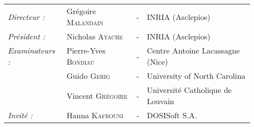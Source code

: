 \begin{titlepage}
\begin{center}
\begin{tabular}{llcl}
      \textit{Directeur :}	& Grégoire \textsc{Malandain}		& - & INRIA (Asclepios)\\
      \textit{Président :}	& Nicholas \textsc{Ayache}		& - & INRIA (Asclepios)\\
      \textit{Examinateurs :}   & Pierre-Yves \textsc{Bondiau}          & - & Centre Antoine Lacassagne (Nice)\\
      				& Guido \textsc{Gerig}			& - & University of North Carolina\\
      				& Vincent \textsc{Grégoire}		& - & Université Catholique de Louvain\\
      \textit{Invité :}		& Hanna \textsc{Kafrouni}		& - & DOSISoft S.A.
\end{tabular}
\end{center}
\end{titlepage}
\sloppy

\titlepage
